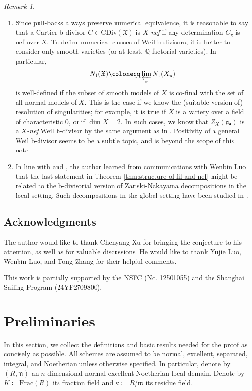 \documentclass[11pt, leqno]{amsart}%
\theoremstyle{plain}
\theoremstyle{definition}
\theoremstyle{remark}
\newtheorem{remark}[theorem]{Remark}
\newcommand{\bQ}{\mathbb{Q}}
\newcommand{\fX}{\mathfrak{X}}
\newcommand{\fa}{\mathfrak{a}}
\newcommand{\fm}{\mathfrak{m}}
\newcommand{\Frac}{\mathrm{Frac}}
\newcommand{\CDiv}{\mathrm{CDiv}}
\begin{document}
\begin{remark}
\begin{enumerate}
    \item Since pull-backs always preserve numerical equivalence, it is reasonable to say that a Cartier b-divisor $C\in\CDiv(\fX)$ is \emph{$X$-nef} if any determination $C_\pi$ is nef over $X$. 
    To define numerical classes of Weil b-divisors, it is better to consider only smooth varieties (or at least, $\bQ$-factorial varieties).
    In particular, 
    \[
        N_1(\fX)\coloneqq \varprojlim_\pi N_1(X_\pi)
    \]
    is well-defined if the subset of smooth models of $X$ is co-final with the set of all normal models of $X$. This is the case if we know the (suitable version of) resolution of singularities; for example, it is true if $X$ is a variety over a field of characteristic $0$, or if $\dim X=2$. 
    In such cases, we know that $Z_X(\fa_\bullet)$ is a \emph{$X$-nef} Weil b-divisor by the same argument as in \cite[Proposition 2.1]{BdFF-vol-iso}. 
    Positivity of a general Weil b-divisor seems to be a subtle topic, and is beyond the scope of this note.%

    \item In line with \cite[Section 2.4]{BdFF-vol-iso} and \cite[Example 4.7]{RU-b-div}, the author learned from communications with Wenbin Luo that the last statement in Theorem \ref{thm:structure of fil and nef} might be related to the b-divisorial version of Zariski-Nakayama decompositions in the local setting. Such decompositions in the global setting have been studied in \cites{BFJ-differentiability,KM-b-Zariski}. 
\end{enumerate}
\end{remark}



\subsection*{Acknowledgments}
The author would like to thank Chenyang Xu for bringing the conjecture to his attention, as well as for valuable discussions. He would like to thank Yujie Luo, Wenbin Luo, and Tong Zhang for their helpful comments.

This work is partially supported by the NSFC (No. 12501055) and the Shanghai Sailing Program (24YF2709800).
    

\section{Preliminaries}

In this section, we collect the definitions and basic results needed for the proof as concisely as possible.  
All schemes are assumed to be normal, excellent, separated, integral, and Noetherian unless otherwise specified. 
In particular, denote by $(R,\fm)$ an $n$-dimensional normal excellent Noetherian local domain. 
Denote by $K\coloneqq\Frac(R)$ its fraction field and $\kappa\coloneqq R/\fm$ its residue field.
\end{document}
